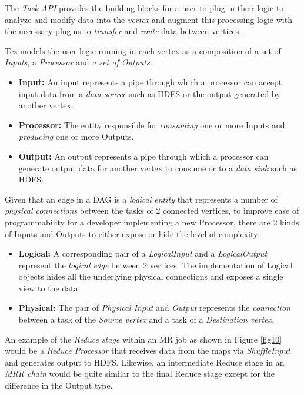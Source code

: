 \documentclass[twocolumn]{article}
\begin{document}
The \textit{Task API} provides the building blocks for a user to plug-in their
logic to analyze and modify data into the \textit{vertex} and augment this
processing logic with the necessary plugins to \emph{transfer} and
\emph{route} data between vertices.

Tez models the user logic running in each vertex as a composition of a
set of \textit{Inputs}, a \textit{Processor} and \textit{a set of Outputs}.

\begin{itemize}
\item
  \textbf{Input:} An input represents a pipe through which a processor
  can accept input data from a \emph{data source} such as HDFS or the
  output generated by another vertex.
\item
  \textbf{Processor:} The entity responsible for \emph{consuming} one or
  more Inputs and \emph{producing} one or more Outputs.
\item
  \textbf{Output:} An output represents a pipe through which a processor
  can generate output data for another vertex to consume or to a
  \emph{data sink} such as HDFS.
\end{itemize}

Given that an edge in a DAG is a \textit{logical entity} that represents a number
of \textit{physical connections} between the tasks of 2 connected vertices, to
improve ease of programmability for a developer implementing a new
Processor, there are 2 kinds of Inputs and Outputs to either expose or
hide the level of complexity:

\begin{itemize}
\item
  \textbf{Logical:} A corresponding pair of a \emph{LogicalInput} and a
  \emph{LogicalOutput} represent the \emph{logical edge} between 2
  vertices. The implementation of Logical objects hides all the
  underlying physical connections and exposes a single view to the
  data.
\item
  \textbf{Physical:} The pair of \textit{Physical Input} and \textit{Output} represents
  the \emph{connection} between a task of the \emph{Source vertex} and a
  task of a \emph{Destination vertex}.
\end{itemize}

An example of the \emph{Reduce stage} within an MR job as shown in Figure \ref{fig10} would be a
\emph{Reduce Processor} that receives data from the maps via
\emph{ShuffleInput} and generates output to HDFS. Likewise, an
intermediate Reduce stage in an \emph{MRR chain} would be quite
similar to the final Reduce stage except for the difference in the
Output type.
\end{document}
